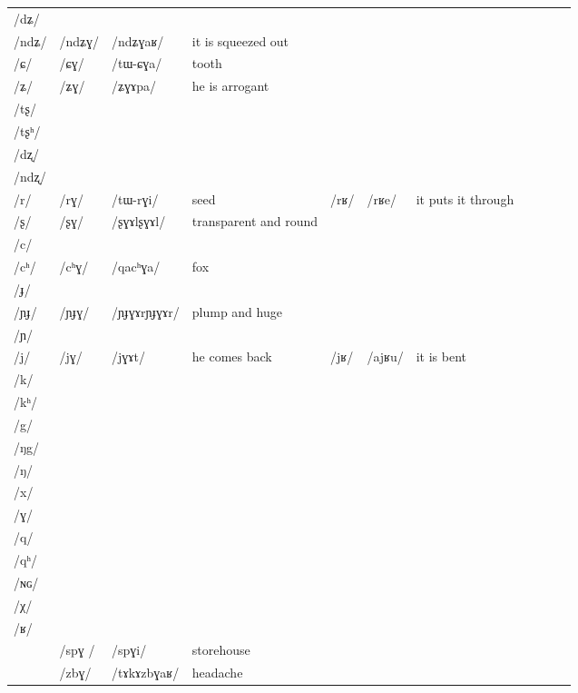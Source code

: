 \documentclass[oldfontcommands,oneside,a4paper,11pt]{article}
\newcommand{\ipa}[1]{\mbox{/#1/}} %
\newcommand{\deux}[1]{/#1/}
\newcommand{\trois}[1]{/#1/}
\newcommand{\idph}[1]{\cellcolor{gray}\textbf{#1}}
\begin{document}
\begin{landscape}
\begin{longtable}{l|lll|lll|lll|l}
\ipa{dʑ}  	&    	&    	&  	&	&	& \\	
\ipa{ndʑ}  	&  \deux{ndʑɣ}  	&  \ipa{ndʑɣaʁ}  	&  it is squeezed out	&	&	& \\	
\ipa{ɕ}  	&  \deux{ɕɣ}  	&  \ipa{tɯ-ɕɣa}  	&  tooth	&	&	& \\	
\ipa{ʑ}  	&  \deux{ʑɣ}  	&  \ipa{ʑɣɤpa}  	& he is arrogant 	&	&	& \\	
\ipa{tʂ}  	&    	&    	&  	&	&	& \\	
\ipa{tʂʰ}  	&    	&    	&  	&	&	& \\	
\ipa{dʐ}  	&    	&    	&  	&	&	& \\	
\ipa{ndʐ}  	&    	&    	&  	&	&	& \\	
\ipa{r}  	&  \deux{rɣ}  	&  \ipa{tɯ-rɣi}  	&  seed	&\deux{rʁ}	&\ipa{rʁe}	& it puts it through\\	
\ipa{ʂ}  	&  \deux{ʂɣ} \idph{} 	&  \ipa{ʂɣɤlʂɣɤl}  	& transparent and round	&	&	& \\	
\ipa{c}  	&    	&    	&  	&	&	& \\	
\ipa{cʰ}  	&  \deux{cʰɣ}  	&  \ipa{qacʰɣa}  	&fox  	&	&	& \\	
\ipa{ɟ}  	&    	&    	&  	&	&	& \\	
\ipa{ɲɟ}  	&  \deux{ɲɟɣ} \idph{} 	&  \ipa{ɲɟɣɤrɲɟɣɤr}  	&   plump and huge	&	&	& \\	
\ipa{ɲ}  	&    	&    	&  	&	&	& \\	
\ipa{j}  	&  \deux{jɣ}  	&  \ipa{jɣɤt}  	&he comes back  	&\deux{jʁ}	&\ipa{ajʁu}	&it is bent \\	
\ipa{k}  	&    	&    	&  	&	&	& \\	
\ipa{kʰ}  	&    	&    	&  	&	&	& \\	
\ipa{g}  	&    	&    	&  	&	&	& \\	
\ipa{ŋg}  	&    	&    	&  	&	&	& \\	
\ipa{ŋ}  	&    	&    	&  	&	&	& \\	
\ipa{x}  	&    	&    	&  	&	&	& \\	
\ipa{ɣ}  	&    	&    	&  	&	&	& \\	
\ipa{q}  	&    	&    	&  	&	&	& \\	
\ipa{qʰ}  	&    	&    	&  	&	&	& \\	
\ipa{ɴɢ}  	&    	&    	&  	&	&	& \\	
\ipa{χ}  	&    	&    	&  	&	&	& \\	
\ipa{ʁ}  	&    	&    	&  	&	&	& \\	
\midrule						
	&\trois{spɣ }  	&\ipa{spɣi}  	&storehouse	&	&	&\\
	&\trois{zbɣ}  	&\ipa{tɤkɤzbɣaʁ}  	&headache	&	&	&\\

\end{longtable}
\end{landscape}
\end{document}
